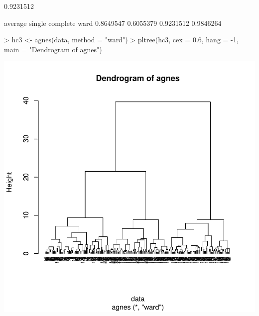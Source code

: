 \documentclass [a4paper] {article}
\begin{document}
\begin{Schunk}
\begin{Soutput}
[1] 0.9231512
\end{Soutput}
\begin{Soutput}
  average    single  complete      ward 
0.8649547 0.6055379 0.9231512 0.9846264 
\end{Soutput}
\begin{Sinput}
> hc3 <- agnes(data, method = "ward")
> pltree(hc3, cex = 0.6, hang = -1, main = "Dendrogram of agnes")
\end{Sinput}
\end{Schunk}
\includegraphics{entrega-jerarquico_2}
\end{document}
